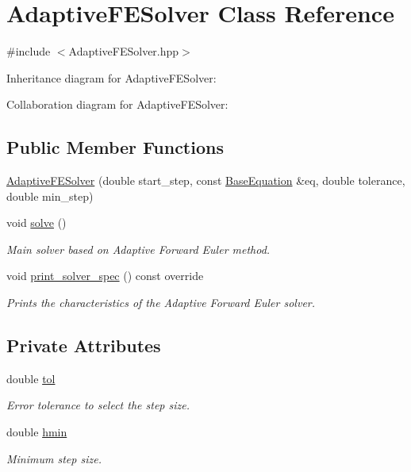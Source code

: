 \hypertarget{classAdaptiveFESolver}{}\section{Adaptive\+F\+E\+Solver Class Reference}
\label{classAdaptiveFESolver}


{\ttfamily \#include $<$Adaptive\+F\+E\+Solver.\+hpp$>$}



Inheritance diagram for Adaptive\+F\+E\+Solver\+:


Collaboration diagram for Adaptive\+F\+E\+Solver\+:
\subsection*{Public Member Functions}
\begin{DoxyCompactItemize}
\item 
\hyperlink{classAdaptiveFESolver_aeeb5a4b36f9e54027ddc576fa0c73b83}{Adaptive\+F\+E\+Solver} (double start\+\_\+step, const \hyperlink{classBaseEquation}{Base\+Equation} \&eq, double tolerance, double min\+\_\+step)
\item 
void \hyperlink{classAdaptiveFESolver_a2d18dfe7c73872501d96df7fb1967f5f}{solve} ()
\begin{DoxyCompactList}\small\item\em Main solver based on Adaptive Forward Euler method. \end{DoxyCompactList}\item 
void \hyperlink{classAdaptiveFESolver_a8d15ec3bd7db8e46eca25382ba8130ae}{print\+\_\+solver\+\_\+spec} () const override
\begin{DoxyCompactList}\small\item\em Prints the characteristics of the Adaptive Forward Euler solver. \end{DoxyCompactList}\end{DoxyCompactItemize}
\subsection*{Private Attributes}
\begin{DoxyCompactItemize}
\item 
double \hyperlink{classAdaptiveFESolver_a589e2aa0d09dbbcc103f5c072a6da69a}{tol}
\begin{DoxyCompactList}\small\item\em Error tolerance to select the step size. \end{DoxyCompactList}\item 
double \hyperlink{classAdaptiveFESolver_a138ebbe940e45ae7b34132b571f6b8d5}{hmin}
\begin{DoxyCompactList}\small\item\em Minimum step size. \end{DoxyCompactList}\end{DoxyCompactItemize}
